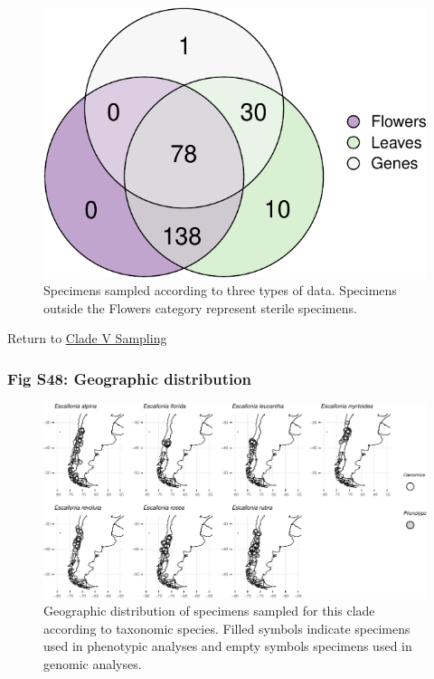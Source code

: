 \documentclass[
  11pt,
]{article}
\begin{document}
\begin{figure}

{\centering \includegraphics{Supplementary_Material_files/figure-latex/CladeVVennDiagram-1} 

}

\caption{Specimens sampled according to three types of data. Specimens outside the Flowers category represent sterile specimens.}\label{fig:CladeVVennDiagram}
\end{figure}

Return to \protect\hyperlink{sampling-5}{Clade V Sampling}
\pagebreak

\hypertarget{fig-s48-geographic-distribution}{%
\subsubsection{Fig S48: Geographic distribution}\label{fig-s48-geographic-distribution}}

\begin{figure}

{\centering \includegraphics{Supplementary_Material_files/figure-latex/CladeVsamplingMaps-1} 

}

\caption{Geographic distribution of specimens sampled for this clade according to taxonomic species. Filled symbols indicate specimens used in phenotypic analyses and empty symbols specimens used in genomic analyses.}\label{fig:CladeVsamplingMaps}
\end{figure}
\end{document}
